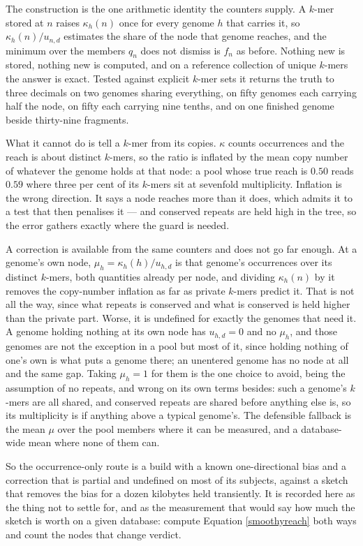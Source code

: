 \documentclass[pdflatex,sn-vancouver-num]{sn-jnl}
\begin{document}
\begin{appendices}
    The construction is the one arithmetic identity the counters supply. A $k$-mer stored at $n$
    raises $\kappa_h(n)$ once for every genome $h$ that carries it, so
    $\kappa_h(n) / u_{n,d}$ estimates the share of the node that genome reaches, and the minimum over
    the members $q_n$ does not dismiss is $f_n$ as before. Nothing new is stored, nothing new is
    computed, and on a reference collection of unique $k$-mers the answer is exact. Tested against
    explicit $k$-mer sets it returns the truth to three decimals on two genomes sharing everything,
    on fifty genomes each carrying half the node, on fifty each carrying nine tenths, and on one
    finished genome beside thirty-nine fragments.

    What it cannot do is tell a $k$-mer from its copies. $\kappa$ counts occurrences and the reach is
    about distinct $k$-mers, so the ratio is inflated by the mean copy number of whatever the genome
    holds at that node: a pool whose true reach is $0.50$ reads $0.59$ where three per cent of its
    $k$-mers sit at sevenfold multiplicity. Inflation is the wrong direction. It says a node reaches
    more than it does, which admits it to a test that then penalises it --- and conserved repeats are
    held high in the tree, so the error gathers exactly where the guard is needed.

    A correction is available from the same counters and does not go far enough. At a genome's own
    node, $\mu_h = \kappa_h(h) / u_{h,d}$ is that genome's occurrences over its distinct $k$-mers,
    both quantities already per node, and dividing $\kappa_h(n)$ by it removes the copy-number
    inflation as far as private $k$-mers predict it. That is not all the way, since what repeats is
    conserved and what is conserved is held higher than the private part. Worse, it is undefined for
    exactly the genomes that need it. A genome holding nothing at its own node has $u_{h,d} = 0$ and
    no $\mu_h$, and those genomes are not the exception in a pool but most of it, since holding
    nothing of one's own is what puts a genome there; an unentered genome has no node at all and the
    same gap. Taking $\mu_h = 1$ for them is the one choice to avoid, being the assumption of no
    repeats, and wrong on its own terms besides: such a genome's $k$-mers are all shared, and
    conserved repeats are shared before anything else is, so its multiplicity is if anything above a
    typical genome's. The defensible fallback is the mean $\mu$ over the pool members where it can be
    measured, and a database-wide mean where none of them can.

    So the occurrence-only route is a build with a known one-directional bias and a correction that
    is partial and undefined on most of its subjects, against a sketch that removes the bias for a
    dozen kilobytes held transiently. It is recorded here as the thing not to settle for, and as the
    measurement that would say how much the sketch is worth on a given database: compute
    Equation \eqref{smoothyreach} both ways and count the nodes that change verdict.

    \end{appendices}
\end{document}
